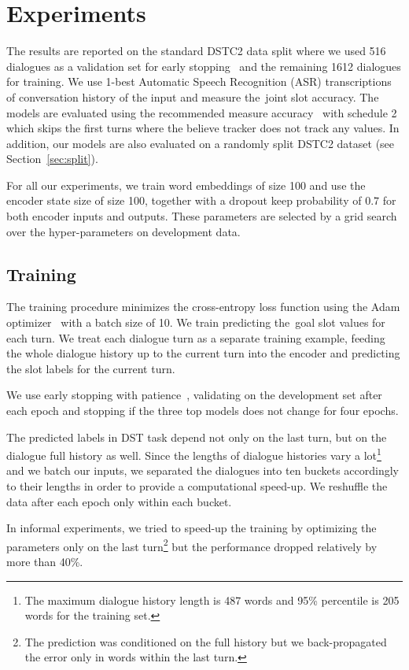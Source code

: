 \documentclass{itatnew}
\begin{document}
\section{Experiments}\label{sec:exp}
The results are reported on the standard DSTC2 data split where we used 516 dialogues as a validation set for early stopping~\cite{prechelt1998early} and the remaining 1612 dialogues for training.
We use 1-best Automatic Speech Recognition (ASR) transcriptions of conversation history of the input and measure the~joint slot accuracy.
The models are evaluated using the recommended measure accuracy~\cite{henderson2014second} with schedule 2 which skips the first turns where the believe tracker does not track any values. 
In addition, our models are also evaluated on a randomly split DSTC2 dataset (see Section~\ref{sec:split}).

For all our experiments, we train word embeddings of size 100 and use the encoder state size of size 100, together with a dropout keep probability of $0.7$ for both encoder inputs and outputs.
These parameters are selected by a grid search over the hyper-parameters on development data.

\subsection{Training}
\label{sec:train}
The training procedure minimizes the cross-entropy loss function using the Adam optimizer~\cite{kingma2014adam} with a batch size of 10.
We train predicting the~goal slot values for each turn.
We treat each dialogue turn as a separate training example, feeding the whole dialogue history up to the current turn into the encoder and predicting the slot labels for the current turn.

We use early stopping with patience~\cite{prechelt1998early}, validating on the development set after each epoch and stopping if the three top models does not change for four epochs.

The predicted labels in DST task depend not only on the last turn, but on the dialogue full history as well.
Since the lengths of dialogue histories vary a lot\footnote{The maximum dialogue history length is 487 words and 95\% percentile is 205 words for the training set.} and we batch our inputs, we separated the dialogues into ten buckets accordingly to their lengths in order to provide a computational speed-up. We reshuffle the data after each epoch only within each bucket.

In informal experiments, we tried to speed-up the training by  optimizing the parameters only on the last turn\footnote{The prediction was conditioned on the full history but we back-propagated the error only in words within the last turn.} but the performance dropped relatively by more than 40\%.
\end{document}
